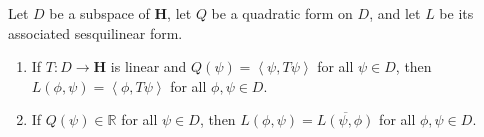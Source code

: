\begin{proposition}
    \label{prpstn:quadratic-forms-on-a-subspace-properties}
    \leanok
    Let $D$ be a subspace of $\mathbf{H}$, let $Q$ be a quadratic form on $D$, and let $L$ be its associated sesquilinear form.
    \begin{enumerate}
        \item If $T : D \to \mathbf{H}$ is linear and $Q(\psi) = \left< \psi, T\psi \right>$ for all $\psi \in D$, then $L(\phi, \psi) = \left< \phi, T\psi \right>$ for all $\phi, \psi \in D$.
        \item If $Q(\psi) \in \mathbb{R}$ for all $\psi \in D$, then $L(\phi, \psi) = \overline{L(\psi, \phi)}$ for all $\phi, \psi \in D$.
    \end{enumerate}
\end{proposition}
